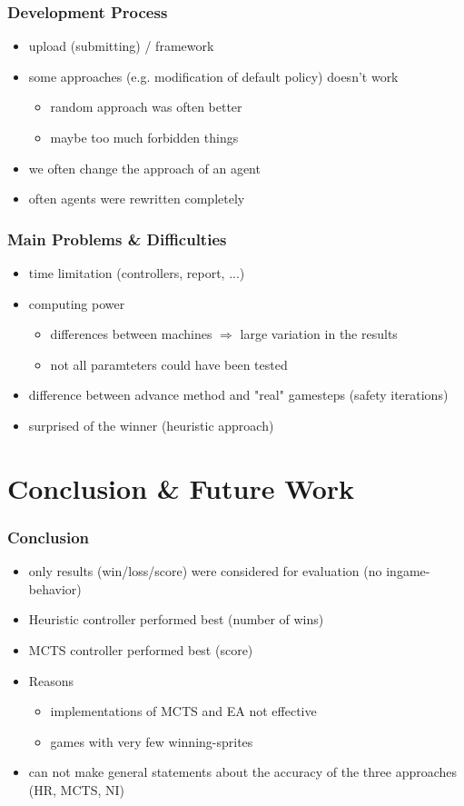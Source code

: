 \documentclass{beamer}
\begin{document}
\begin{frame}
\frametitle{Development Process}
\begin{itemize}
	\item upload (submitting) / framework
	\item some approaches (e.g. modification of default policy) doesn't work
	\begin{itemize}
		\item random approach was often better
		\item maybe too much forbidden things
	\end{itemize}
	\item we often change the approach of an agent
	\item often agents were rewritten completely
\end{itemize}
\end{frame}

\begin{frame}
\frametitle{Main Problems \& Difficulties}
\begin{itemize}
	\item time limitation (controllers, report, ...)
	\item computing power
	\begin{itemize}
		\item differences between machines $\Rightarrow$ large variation in the results
		\item not all paramteters could have been tested
	\end{itemize}
	\item difference between advance method and "real" gamesteps (safety iterations)
	\item surprised of the winner (heuristic approach)
\end{itemize}
\end{frame}

\section{Conclusion \& Future Work}

\begin{frame}
\frametitle{Conclusion}
\begin{itemize}
		\item only results (win/loss/score) were considered for evaluation (no ingame-behavior)
		\item Heuristic controller performed best (number of wins)
		\item MCTS controller performed best (score)
		\item Reasons
		\begin{itemize}
			\item implementations of MCTS and EA not effective
			\item games with very few winning-sprites
		\end{itemize}
		\item can not make general statements about the accuracy of the three approaches  (HR, MCTS, NI)
\end{itemize}

\end{frame}
\end{document}
